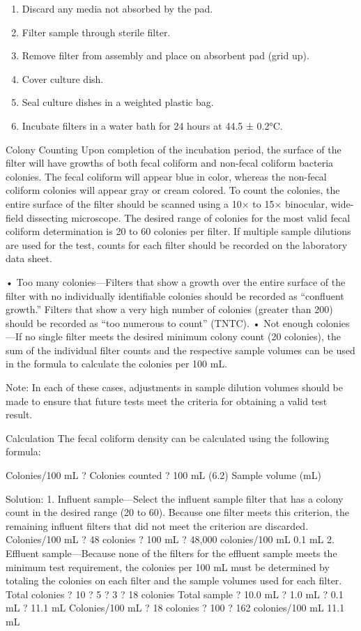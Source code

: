 \documentclass{article}
\begin{document}
\begin{enumerate}

\item
  Discard any media not absorbed by the pad.
\item
  Filter sample through sterile filter.
\item
  Remove filter from assembly and place on absorbent pad (grid up).
\item
  Cover culture dish.
\item
  Seal culture dishes in a weighted plastic bag.
\item
  Incubate filters in a water bath for 24 hours at 44.5 ± 0.2°C.
\end{enumerate}

Colony Counting Upon completion of the incubation period, the surface of
the filter will have growths of both fecal coliform and non-fecal
coliform bacteria colonies. The fecal coliform will appear blue in
color, whereas the non-fecal coliform colonies will appear gray or cream
colored. To count the colonies, the entire surface of the filter should
be scanned using a 10× to 15× binocular, wide-field dissecting
microscope. The desired range of colonies for the most valid fecal
coliform determination is 20 to 60 colonies per filter. If multiple
sample dilutions are used for the test, counts for each filter should be
recorded on the laboratory data sheet.

• Too many colonies---Filters that show a growth over the entire surface
of the filter with no individually identifiable colonies should be
recorded as ``confluent growth.'' Filters that show a very high number
of colonies (greater than 200) should be recorded as ``too numerous to
count'' (TNTC). • Not enough colonies---If no single filter meets the
desired minimum colony count (20 colonies), the sum of the individual
filter counts and the respective sample volumes can be used in the
formula to calculate the colonies per 100 mL.

Note: In each of these cases, adjustments in sample dilution volumes
should be made to ensure that future tests meet the criteria for
obtaining a valid test result.

Calculation The fecal coliform density can be calculated using the
following formula:

Colonies/100 mL ? Colonies counted ? 100 mL (6.2) Sample volume (mL)

Solution: 1. Influent sample---Select the influent sample filter that
has a colony count in the desired range (20 to 60). Because one filter
meets this criterion, the remaining influent filters that did not meet
the criterion are discarded. Colonies/100 mL ? 48 colonies ? 100 mL ?
48,000 colonies/100 mL 0.1 mL 2. Effluent sample---Because none of the
filters for the effluent sample meets the minimum test requirement, the
colonies per 100 mL must be determined by totaling the colonies on each
filter and the sample volumes used for each filter. Total colonies ? 10
? 5 ? 3 ? 18 colonies Total sample ? 10.0 mL ? 1.0 mL ? 0.1 mL ? 11.1 mL
Colonies/100 mL ? 18 colonies ? 100 ? 162 colonies/100 mL 11.1 mL
\end{document}

